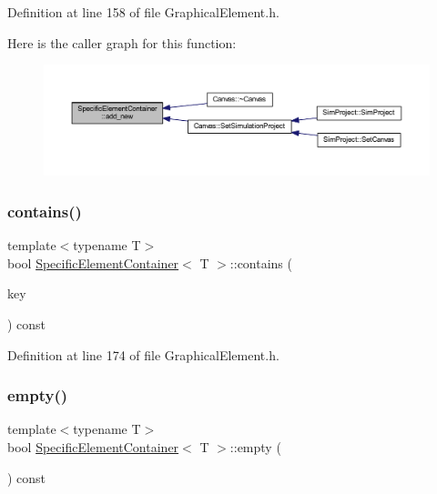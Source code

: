 Definition at line 158 of file Graphical\+Element.\+h.

Here is the caller graph for this function\+:
\nopagebreak
\begin{figure}[H]
\begin{center}
\leavevmode
\includegraphics[width=350pt]{class_specific_element_container_a6a3c2ba0b46445d1504489d5c2ef3530_icgraph}
\end{center}
\end{figure}
\mbox{\label{class_specific_element_container_a55f9c50b8520d9e89aa11a31be58a0f0}} 
\subsubsection{\texorpdfstring{contains()}{contains()}}
{\footnotesize\ttfamily template$<$typename T$>$ \\
bool \hyperlink{class_specific_element_container}{Specific\+Element\+Container}$<$ T $>$\+::contains (\begin{DoxyParamCaption}\item[{const \hyperlink{_graphical_element_8h_ade5fd6c85839a416577ff9de1605141e}{Element\+Key} \&}]{key }\end{DoxyParamCaption}) const\hspace{0.3cm}{\ttfamily [inline]}}



Definition at line 174 of file Graphical\+Element.\+h.

\mbox{\label{class_specific_element_container_aead401f8325d8f15b5d63896f146d46b}} 
\subsubsection{\texorpdfstring{empty()}{empty()}}
{\footnotesize\ttfamily template$<$typename T$>$ \\
bool \hyperlink{class_specific_element_container}{Specific\+Element\+Container}$<$ T $>$\+::empty (\begin{DoxyParamCaption}{ }\end{DoxyParamCaption}) const\hspace{0.3cm}{\ttfamily [inline]}}



